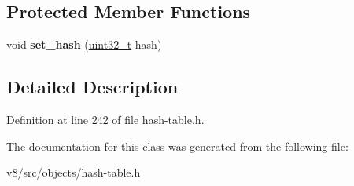 \subsection*{Protected Member Functions}
\begin{DoxyCompactItemize}
\item 
\mbox{\label{classv8_1_1internal_1_1HashTableKey_aa07f8caf64c2d65db1200b8ba3d677b2}} 
void {\bfseries set\+\_\+hash} (\mbox{\hyperlink{classuint32__t}{uint32\+\_\+t}} hash)
\end{DoxyCompactItemize}


\subsection{Detailed Description}


Definition at line 242 of file hash-\/table.\+h.



The documentation for this class was generated from the following file\+:\begin{DoxyCompactItemize}
\item 
v8/src/objects/hash-\/table.\+h\end{DoxyCompactItemize}
